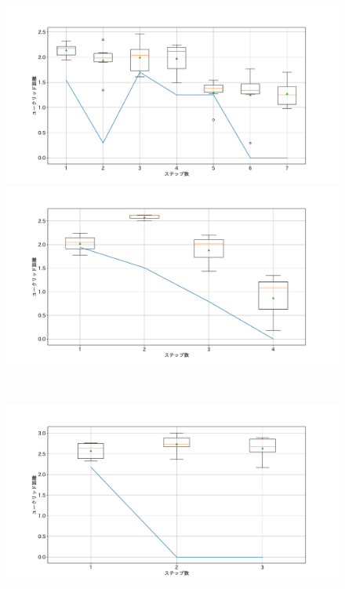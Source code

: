 \begin{figure}[h]
 \begin{minipage}[b]{0.48\linewidth}
  \centering
  \includegraphics[scale=0.15]{./imgs/gaChange/sofa1_1.pdf}
 \end{minipage}
 \begin{minipage}[b]{0.48\linewidth}
  \centering
  \includegraphics[scale=0.15]{./imgs/gaChange/sofa2_1.pdf}
 \end{minipage}\\
 \begin{minipage}[b]{0.48\linewidth}
  \centering
  \includegraphics[scale=0.15]{./imgs/gaChange/sofa1_2.pdf}

\end{minipage}
\end{figure}
